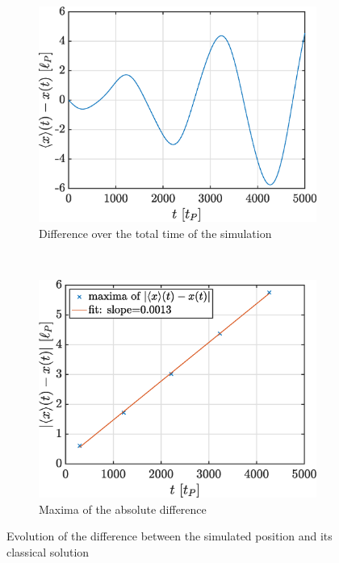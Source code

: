 \documentclass[a4paper,12pt,twoside]{article}
\begin{document}
\begin{figure}[h!]
 \begin{subfigure}[t]{0.45\textwidth}
 \includegraphics[width=\textwidth]{graphs/ii_diffx.eps}
  \caption{Difference over the total time of the simulation}
 \end{subfigure}
 ~
 \begin{subfigure}[t]{0.45\textwidth}
 \includegraphics[width=\textwidth]{graphs/ii_diffxsl.eps}
  \caption{Maxima of the absolute difference}
 \end{subfigure}
\caption{Evolution of the difference between the simulated position and its classical solution}
\label{fig:ii_diffx}
\end{figure}
\end{document}

